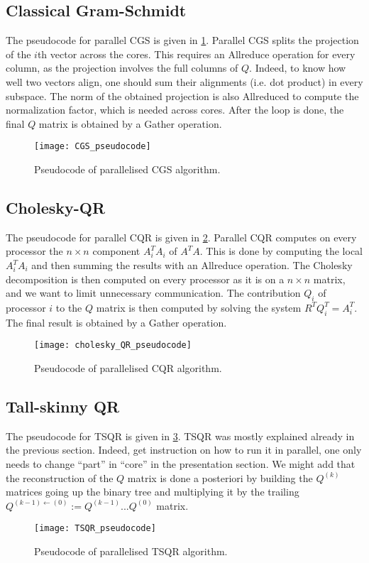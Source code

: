 \documentclass[a4paper, 12pt,oneside]{article}
\begin{document}
		\subsection{Classical Gram-Schmidt}
			The pseudocode for parallel CGS is given in \ref{fig:CGS-pseudocode}.   
			Parallel CGS splits the projection of the $i$th vector across the cores. This requires an Allreduce operation for every column, as the projection involves the full columns of $Q$. Indeed, to know how well two vectors align, one should sum their alignments (i.e. dot product) in every subspace. The norm of the obtained projection is also Allreduced to compute the normalization factor, which is needed across cores. After the loop is done, the final $Q$ matrix is obtained by a Gather operation.
			\begin{figure}[htb]       
				\centering             
					\vspace{0em}
					\texttt{[image: CGS\_pseudocode]}
					\caption{Pseudocode of parallelised CGS algorithm.}
					\label{fig:CGS-pseudocode}
			\end{figure}
		\subsection{Cholesky-QR}
			The pseudocode for parallel CQR is given in \ref{fig:Cholesky-QR-pseudocode}.
			Parallel CQR computes on every processor the $n\times n$ component $A_i^TA_i$ of $A^TA$. This is done by computing the local $A_i^TA_i$ and then summing the results with an Allreduce operation. The Cholesky decomposition is then computed on every processor as it is on a $n\times n$ matrix, and we want to limit unnecessary communication. The contribution $Q_i$ of processor $i$ to the $Q$ matrix is then computed by solving the system $R^TQ_i^T=A_i^T$. The final result is obtained by a Gather operation. 
			\begin{figure}
				\centering
				\texttt{[image: cholesky\_QR\_pseudocode]}
				\caption{Pseudocode of parallelised CQR algorithm.}
				\label{fig:Cholesky-QR-pseudocode}
			\end{figure}
		\subsection{Tall-skinny QR}
			The pseudocode for TSQR is given in \ref{fig:TSQR-pseudocode}.
			TSQR was mostly explained already in the previous section. Indeed, get instruction on how to run it in parallel, one only needs to change ``part'' in ``core'' in the presentation section. We might add that the reconstruction of the $Q$ matrix is done a posteriori by building the $Q^{(k)}$ matrices going up the binary tree and multiplying it by the trailing $Q^{(k-1)\leftarrow(0)}:=Q^{(k-1)}...Q^{(0)}$ matrix. 
			\begin{figure}
				\centering
				\texttt{[image: TSQR\_pseudocode]}
				\caption{Pseudocode of parallelised TSQR algorithm.}
				\label{fig:TSQR-pseudocode}
			\end{figure}
\end{document}
